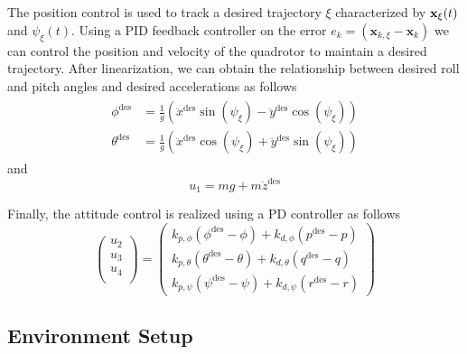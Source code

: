 The position control is used to track a desired trajectory $\xi$ characterized by ${\bf {x}}_\xi(t)$ and $\psi_\xi(t)$. Using a PID feedback controller on the error $e_k=(\mathbf {x}_{k,\xi}-\mathbf {x}_k)$ we can control the position and velocity of the quadrotor to maintain a desired trajectory.
After linearization, we can obtain the relationship between desired roll and pitch angles and desired accelerations as follows
\begin{gather}
\begin{align}
\phi^{\textrm{des}} &= \frac{1}{g}\left(\ddot{x}^{\textrm{des}}\sin(\psi_\xi) - \ddot{y}^{\textrm{des}}\cos(\psi_\xi)\right)\\
\theta^{\textrm{des}} &= \frac{1}{g}\left(\ddot{x}^{\textrm{des}}\cos(\psi_\xi) + \ddot{y}^{\textrm{des}}\sin(\psi_\xi)\right)
\end{align}
\end{gather}
and 
\begin{equation}
u_1 = mg + m\ddot{z}^{\textrm{des}} 
\end{equation}
 
Finally, the attitude control is realized using a PD controller as follows
\begin{equation}\label{eq:att}
\left(%
\begin{array}{c}
  u_2 \\
  u_3\\
  u_4\\
\end{array}%
\right) =\left(%
\begin{array}{c}
k_{p,\phi}(\phi^{\textrm{des}} - \phi) + k_{d,\phi}(p^{\textrm{des}} - p)\\
k_{p,\theta}(\theta^{\textrm{des}} - \theta) + k_{d,\theta}(q^{\textrm{des}} - q)\\
k_{p,\psi}(\psi^{\textrm{des}} - \psi) + k_{d,\psi}(r^{\textrm{des}} - r)
\end{array}%
\right)
\end{equation}



\subsection{Environment Setup}

